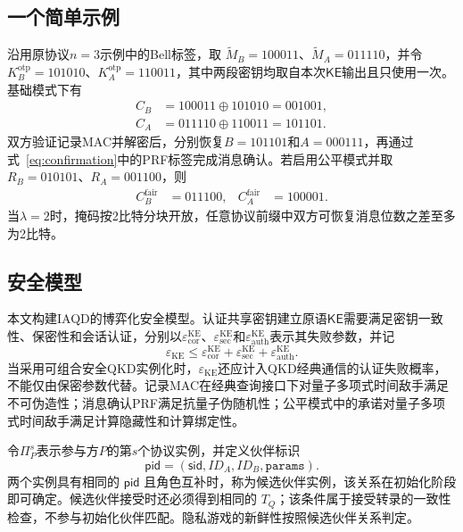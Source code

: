 \documentclass[UTF8,10pt,a4paper]{ctexart}
\theoremstyle{aqdplain}
\newcommand{\sid}{\mathsf{sid}}
\begin{document}
\subsection{一个简单示例}

沿用原协议$n=3$示例中的Bell标签，取
$\widetilde M_B=100011$、$\widetilde M_A=011110$，并令
$K_B^{\mathrm{otp}}=101010$、$K_A^{\mathrm{otp}}=110011$，其中两段密钥均取自本次$\mathsf{KE}$输出且只使用一次。基础模式下有
\begin{align}
C_B&=100011\oplus101010=001001,\nonumber\\
C_A&=011110\oplus110011=101101.
\label{eq:iaqd-base-example}
\end{align}
双方验证记录MAC并解密后，分别恢复$B=101101$和$A=000111$，再通过式~\eqref{eq:confirmation}中的PRF标签完成消息确认。若启用公平模式并取$R_B=010101$、$R_A=001100$，则
\begin{align}
C_B^{\mathrm{fair}}&=011100,&
C_A^{\mathrm{fair}}&=100001.
\label{eq:iaqd-fair-example}
\end{align}
当$\lambda=2$时，掩码按2比特分块开放，任意协议前缀中双方可恢复消息位数之差至多为2比特。

\subsection{安全模型}
\label{sec:security-model}

本文构建IAQD的博弈化安全模型。认证共享密钥建立原语$\mathsf{KE}$需要满足密钥一致性、保密性和会话认证，分别以$\varepsilon_{\mathrm{cor}}^{\mathrm{KE}}$、$\varepsilon_{\mathrm{sec}}^{\mathrm{KE}}$和$\varepsilon_{\mathrm{auth}}^{\mathrm{KE}}$表示其失败参数，并记
\begin{equation}
\varepsilon_{\mathrm{KE}}\leq
\varepsilon_{\mathrm{cor}}^{\mathrm{KE}}+
\varepsilon_{\mathrm{sec}}^{\mathrm{KE}}+
\varepsilon_{\mathrm{auth}}^{\mathrm{KE}}.
\label{eq:ke-error}
\end{equation}
当采用可组合安全QKD实例化时，$\varepsilon_{\mathrm{KE}}$还应计入QKD经典通信的认证失败概率，不能仅由保密参数代替。记录MAC在经典查询接口下对量子多项式时间敌手满足不可伪造性\citep{wegman1981,boneh2013qmac}；消息确认PRF满足抗量子伪随机性\citep{zhandry2012qprf}；公平模式中的承诺对量子多项式时间敌手满足计算隐藏性和计算绑定性\citep{unruh2016commitment}。

令$\Pi_P^s$表示参与方$P$的第$s$个协议实例，并定义伙伴标识
\begin{equation}
\mathsf{pid}=(\sid,ID_A,ID_B,\mathtt{params}).
\label{eq:partner-id}
\end{equation}
两个实例具有相同的 \(\mathsf{pid}\) 且角色互补时，称为候选伙伴实例，该关系在初始化阶段即可确定。候选伙伴接受时还必须得到相同的 \(T_Q\)；该条件属于接受转录的一致性检查，不参与初始化伙伴匹配。隐私游戏的新鲜性按照候选伙伴关系判定。
\end{document}
